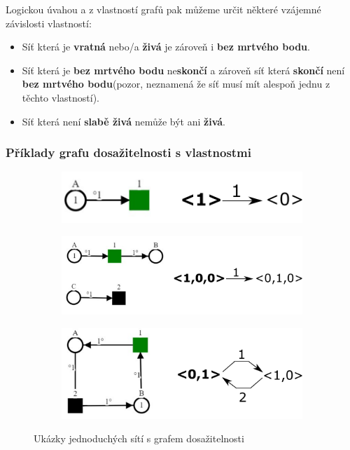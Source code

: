 \documentclass[
  biblatex,
  glossaries,
]{kidiplom}
\begin{document}
Logickou úvahou a z vlastností grafů pak můžeme určit některé vzájemné
 závislosti vlastností:
\begin{itemize}
  \item Síť která je \textbf{vratná} nebo/a \textbf{živá} je zároveň i \textbf{bez mrtvého bodu}.
  \item Síť která je \textbf{bez mrtvého bodu} ne\textbf{skončí} a zároveň síť která \textbf{skončí} není \textbf{bez mrtvého bodu}(pozor, neznamená že síť musí mít alespoň jednu z těchto vlastností). 
  \item Síť která není \textbf{slabě živá} nemůže být ani \textbf{živá}.
\end{itemize}

\clearpage
\subsubsection{Příklady grafu dosažitelnosti s vlastnostmi}\label{příklady sítí}

\begin{figure}[h!]
  \centering
  \begin{subfigure}[h]{\linewidth}
    \centering
    \includegraphics{net_props_01}
    \caption{}\label{fig:ukázka grafu dosažitelnosti 1}
  \end{subfigure}
  
  \begin{subfigure}[h]{\linewidth}
    \includegraphics[width=\linewidth]{net_props_02}
    \caption{}\label{fig:ukázka grafu dosažitelnosti 2}
  \end{subfigure}
  
  \begin{subfigure}[h]{\linewidth}
    \includegraphics[width=\linewidth]{net_props_03}
    \caption{}\label{fig:ukázka grafu dosažitelnosti 3}
  \end{subfigure}
  \caption{Ukázky jednoduchých sítí s grafem dosažitelnosti}\label{fig: ukázky jednoduchých sítí}
\end{figure}
\end{document}
